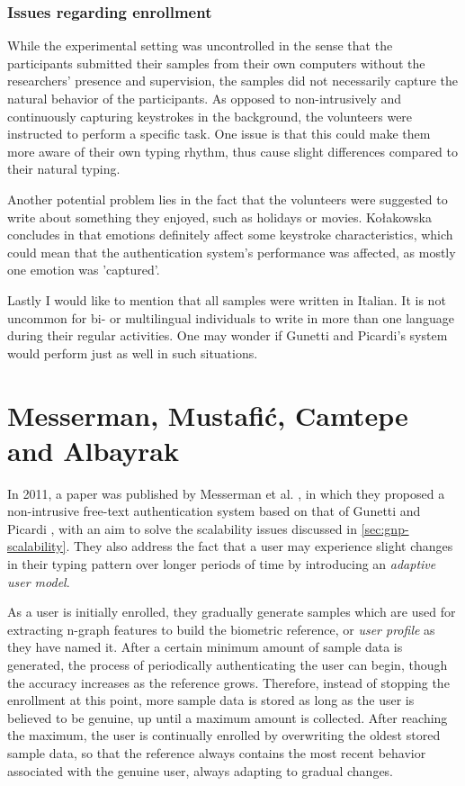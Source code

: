 \documentclass[informationsecurity]{gucmasterproject}
\begin{document}
\subsection{Issues regarding enrollment}
While the experimental setting was uncontrolled in the sense that the participants submitted their samples from their own computers without the researchers' presence and supervision, the samples did not necessarily capture the natural behavior of the participants.
As opposed to non-intrusively and continuously capturing keystrokes in the background, the volunteers were instructed to perform a specific task.
One issue is that this could make them more aware of their own typing rhythm, thus cause slight differences compared to their natural typing.

Another potential problem lies in the fact that the volunteers were suggested to write about something they enjoyed, such as holidays or movies.
Kołakowska concludes in \cite{emotion} that emotions definitely affect some keystroke characteristics, which could mean that the authentication system's performance was affected, as mostly one emotion was 'captured'.

Lastly I would like to mention that all samples were written in Italian.
It is not uncommon for bi- or multilingual individuals to write in more than one language during their regular activities.
One may wonder if Gunetti and Picardi's system would perform just as well in such situations.

\chapter{Messerman, Mustafić, Camtepe and Albayrak}
\label{chap:messerman}

In 2011, a paper was published by Messerman et al. \cite{Messerman}, in which they proposed a non-intrusive free-text authentication system based on that of Gunetti and Picardi \cite{gnp}, with an aim to solve the scalability issues discussed in \cref{sec:gnp-scalability}.
They also address the fact that a user may experience slight changes in their typing pattern over longer periods of time by introducing an \textit{adaptive user model}.

As a user is initially enrolled, they gradually generate samples which are used for extracting n-graph features to build the biometric reference, or \textit{user profile} as they have named it.
After a certain minimum amount of sample data is generated, the process of periodically authenticating the user can begin, though the accuracy increases as the reference grows.
Therefore, instead of stopping the enrollment at this point, more sample data is stored as long as the user is believed to be genuine, up until a maximum amount is collected.
After reaching the maximum, the user is continually enrolled by overwriting the oldest stored sample data, so that the reference always contains the most recent behavior associated with the genuine user, always adapting to gradual changes.
\end{document}
